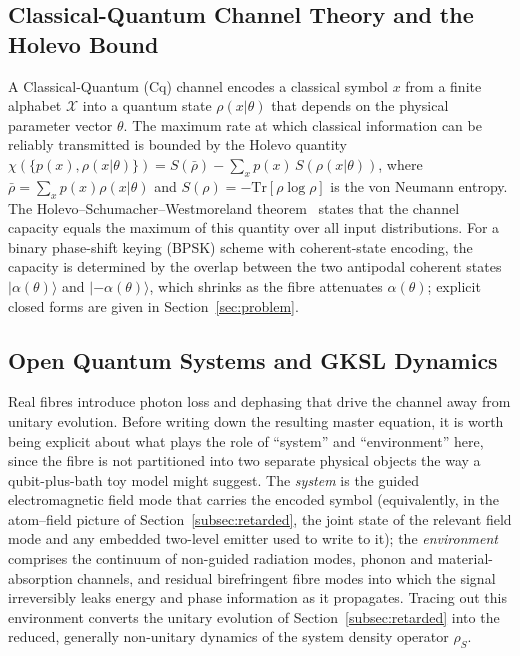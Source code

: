 \documentclass[journal,twocolumn]{IEEEtran}
\theoremstyle{definition}
\theoremstyle{plain}
\newcommand{\Tr}{\mathrm{Tr}}
\begin{document}
\subsection{Classical-Quantum Channel Theory and the Holevo Bound}

A Classical-Quantum (Cq) channel encodes a classical symbol $x$
from a finite alphabet $\mathcal{X}$ into a quantum state
$\rho(x|\theta)$ that depends on the physical parameter vector
$\theta$.  The maximum rate at which classical information can be
reliably transmitted is bounded by the Holevo quantity
$\chi(\{p(x),\rho(x|\theta)\}) = S(\bar\rho) - \sum_x p(x)\,
S(\rho(x|\theta))$, where $\bar\rho = \sum_x p(x)\rho(x|\theta)$
and $S(\rho) = -\Tr[\rho\log\rho]$ is the von Neumann entropy.  The
Holevo--Schumacher--Westmoreland theorem~\cite{holevo1973,schumacher1997}
states that the channel capacity equals the maximum of this quantity
over all input distributions.  For a binary phase-shift keying
(BPSK) scheme with coherent-state encoding, the capacity is
determined by the overlap between the two antipodal coherent states
$|\alpha(\theta)\rangle$ and $|-\alpha(\theta)\rangle$, which
shrinks as the fibre attenuates $\alpha(\theta)$; explicit closed
forms are given in Section~\ref{sec:problem}.

\subsection{Open Quantum Systems and GKSL Dynamics}
Real fibres introduce photon loss and dephasing that drive the
channel away from unitary evolution. Before writing down the
resulting master equation, it is worth being explicit about what
plays the role of ``system'' and ``environment'' here, since the
fibre is not partitioned into two separate physical objects the way
a qubit-plus-bath toy model might suggest. The \emph{system} is the
guided electromagnetic field mode that carries the encoded symbol
(equivalently, in the atom--field picture of
Section~\ref{subsec:retarded}, the joint state of the relevant field
mode and any embedded two-level emitter used to write to it); the
\emph{environment} comprises the continuum of non-guided radiation
modes, phonon and material-absorption channels, and residual
birefringent fibre modes into which the signal irreversibly leaks
energy and phase information as it propagates. Tracing out this
environment converts the unitary evolution of
Section~\ref{subsec:retarded} into the reduced, generally
non-unitary dynamics of the system density operator $\rho_S$.
\end{document}

